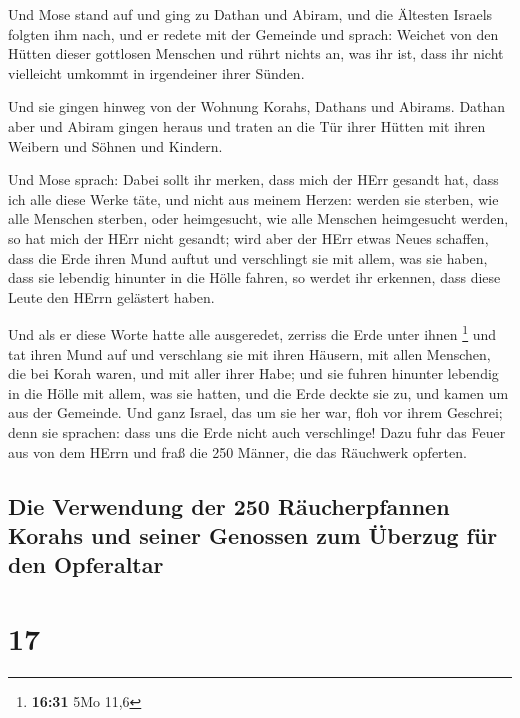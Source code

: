  Und Mose stand auf und ging zu Dathan und Abiram, und
die Ältesten Israels folgten ihm nach,  und er redete mit
der Gemeinde und sprach: Weichet von den Hütten dieser gottlosen
Menschen und rührt nichts an, was ihr ist, dass ihr nicht vielleicht
umkommt in irgendeiner ihrer Sünden.

 Und sie gingen hinweg von der Wohnung Korahs, Dathans
und Abirams. Dathan aber und Abiram gingen heraus und traten an die Tür
ihrer Hütten mit ihren Weibern und Söhnen und Kindern.

 Und Mose sprach: Dabei sollt ihr merken, dass mich der
HErr gesandt hat, dass ich alle diese Werke täte, und nicht aus meinem
Herzen:  werden sie sterben, wie alle Menschen sterben,
oder heimgesucht, wie alle Menschen heimgesucht werden, so hat mich der
HErr nicht gesandt;  wird aber der HErr etwas Neues
schaffen, dass die Erde ihren Mund auftut und verschlingt sie mit allem,
was sie haben, dass sie lebendig hinunter in die Hölle fahren, so werdet
ihr erkennen, dass diese Leute den HErrn gelästert haben.

 Und als er diese Worte hatte alle ausgeredet, zerriss
die Erde unter ihnen \footnote{\textbf{16:31} 5Mo 11,6} 
und tat ihren Mund auf und verschlang sie mit ihren Häusern, mit allen
Menschen, die bei Korah waren, und mit aller ihrer Habe; 
und sie fuhren hinunter lebendig in die Hölle mit allem, was sie hatten,
und die Erde deckte sie zu, und kamen um aus der Gemeinde.
 Und ganz Israel, das um sie her war, floh vor ihrem
Geschrei; denn sie sprachen: dass uns die Erde nicht auch verschlinge!
 Dazu fuhr das Feuer aus von dem HErrn und fraß die 250
Männer, die das Räuchwerk opferten.

\hypertarget{die-verwendung-der-250-ruxe4ucherpfannen-korahs-und-seiner-genossen-zum-uxfcberzug-fuxfcr-den-opferaltar}{%
\subsection{Die Verwendung der 250 Räucherpfannen Korahs und seiner
Genossen zum Überzug für den
Opferaltar}\label{die-verwendung-der-250-ruxe4ucherpfannen-korahs-und-seiner-genossen-zum-uxfcberzug-fuxfcr-den-opferaltar}}

\hypertarget{section-16}{%
\section{17}\label{section-16}}

